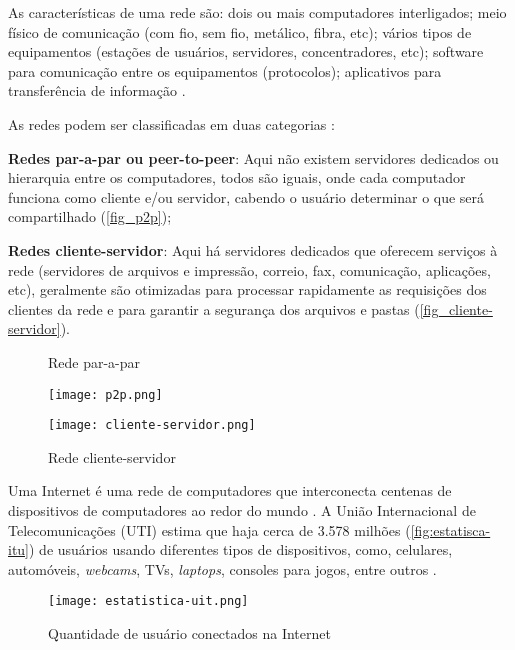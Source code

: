 As características de uma rede são: dois ou mais computadores interligados; meio físico de comunicação (com fio, sem fio, metálico, fibra, etc); vários tipos de equipamentos (estações de usuários, servidores, concentradores, etc); software para comunicação entre os equipamentos (protocolos); aplicativos para transferência de informação \cite{esr:arquitetura}.

As redes podem ser classificadas em duas categorias \cite{esr:arquitetura}: 
\begin{alineas}
\item \textbf{Redes par-a-par ou peer-to-peer}: Aqui não existem servidores dedicados ou hierarquia entre os computadores, todos são iguais, onde cada computador funciona como cliente e/ou servidor, cabendo o usuário determinar o que será compartilhado (\autoref{fig_p2p});
\item \textbf{Redes cliente-servidor}: Aqui há servidores dedicados que oferecem serviços à rede (servidores de arquivos e impressão, correio, fax, comunicação, aplicações, etc), geralmente são otimizadas para processar rapidamente as requisições dos clientes da rede e para garantir a segurança dos arquivos e pastas (\autoref{fig_cliente-servidor}). 
\end{alineas}

\begin{figure}[htb]
 \label{fig:arquitetura-redes}
 \centering
 \begin{minipage}{0.4\textwidth}
  \centering
  \caption{Rede par-a-par} \label{fig_p2p}
  \texttt{[image: p2p.png]}
 \end{minipage}
 \hfill
 \begin{minipage}{0.4\textwidth}
  \centering
  \caption{Rede cliente-servidor} \label{fig_cliente-servidor}
  \texttt{[image: cliente-servidor.png]}
 \end{minipage}
\end{figure}

Uma Internet é uma rede de computadores que interconecta centenas de dispositivos de computadores ao redor do mundo \cite{redes:kurose}. A União Internacional de Telecomunicações (UTI) estima que haja cerca de 3.578 milhões (\autoref{fig:estatisca-itu}) de usuários usando diferentes tipos de dispositivos, como, celulares, automóveis, \textit{webcams}, TVs, \textit{laptops}, consoles para jogos, entre outros \cite{estatistica:itu}.

\begin{figure}[htb]
    \centering
    \caption{Quantidade de usuário conectados na Internet} 
    \texttt{[image: estatistica-uit.png]}
    \label{fig:estatisca-itu}
\end{figure}

